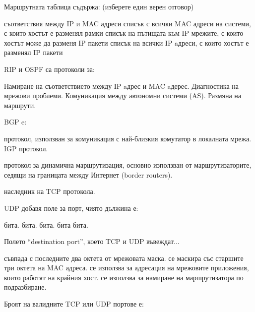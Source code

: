 \begin{questions}
  \question[6] Маршрутната таблица съдържа: (изберете един верен отговор)
  \begin{choices}
    \choice съответствия между IP и MAC адреси
    \choice списък с всички MAC адреси на системи, с които хостът е разменял
    рамки
    \CorrectChoice списък на пътищата към IP мрежите, с които хостът може да
    разменя IP пакети
    \choice списък на всички IP aдреси, с които хостът е разменял IP пакети
  \end{choices}

  \question[6] RIP и OSPF са протоколи за:
  \begin{choices}
    \choice Намиране на съответствието между IP aдрес и MAC aдерес.
    \choice Диагностика на мрежови проблеми.
    \choice Комуникация между автономни системи (AS).
    \CorrectChoice Размяна на маршрути.
  \end{choices}


  \question[6] BGP e:
  \begin{choices}
    \choice протокол, използван за комуникация с най-близкия комутатор в локалната мрежа.
    \choice IGP протокол.

    \CorrectChoice протокол за динамична маршрутизация, основно използван от
    маршрутизаторите, седящи на границата между Интернет
    (\foreignlanguage{english}{border routers}).

    \choice наследник на TCP протокола.
  \end{choices}

  \question[6] UDP добавя поле за порт, чиято дължина е:
  \begin{choices}
     бита.
     бита.
     бита.
     бита
     бита.
  \end{choices}

  \question[6] Полето "`\foreignlanguage{english}{destination port}"', което TCP и UDP въвеждат...
  \begin{choices}
    \choice съвпада с последните два октета от мрежовата маска.
    \choice се маскира със старшите три октета на MAC адреса.
    \CorrectChoice се използва за адресация на мрежовите приложения, които работят на крайния хост.
    \choice се използва за намиране на маршрутизатора по подразбиране.
  \end{choices}

  \question[6] Броят на валидните TCP или UDP портове е:
  \begin{oneparchoices}
  \end{oneparchoices}


\end{questions}
